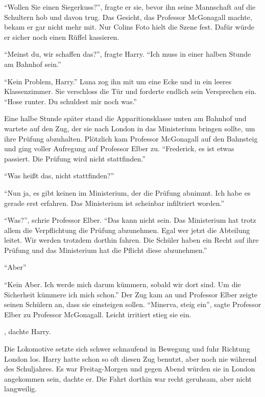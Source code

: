 \enquote{Wollen Sie einen Siegerkuss?}, fragte er sie, bevor ihn seine Mannschaft auf die Schultern hob und davon trug. Das Gesicht, das Professor McGonagall machte, bekam er gar nicht mehr mit. Nur Colins Foto hielt die Szene fest. Dafür würde er sicher noch einen Rüffel kassieren.

\trenn

\enquote{Meinst du, wir schaffen das?}, fragte Harry. \enquote{Ich muss in einer halben Stunde am Bahnhof sein.}

\enquote{Kein Problem, Harry.} Luna zog ihn mit um eine Ecke und in ein leeres Klassenzimmer. Sie verschloss die Tür und forderte endlich sein Versprechen ein. \enquote{Hose runter. Du schuldest mir noch was.}

Eine halbe Stunde später stand die Apparitionsklasse unten am Bahnhof und wartete auf den Zug, der sie nach London in das Ministerium bringen sollte, um ihre Prüfung abzuhalten. Plötzlich kam Professor McGonagall auf den Bahnsteig und ging voller Aufregung auf Professor Elber zu. \enquote{Frederick, es ist etwas passiert. Die Prüfung wird nicht stattfinden.}

\enquote{Was heißt das, nicht stattfinden?}

\enquote{Nun ja, es gibt keinen im Ministerium, der die Prüfung abnimmt. Ich habe es gerade erst erfahren. Das Ministerium ist scheinbar infiltriert worden.}

\enquote{Was?}, schrie Professor Elber. \enquote{Das kann nicht sein. Das Ministerium hat trotz allem die Verpflichtung die Prüfung abzunehmen. Egal wer jetzt die Abteilung leitet. Wir werden trotzdem dorthin fahren. Die Schüler haben ein Recht auf ihre Prüfung und das Ministerium hat die Pflicht diese abzunehmen.}

\enquote{Aber\gst}

\enquote{Kein Aber. Ich werde mich darum kümmern, sobald wir dort sind. Um die Sicherheit kümmere ich mich schon.} Der Zug kam an und Professor Elber zeigte seinen Schülern an, dass sie einsteigen sollen. \enquote{Minerva, steig ein}, sagte Professor Elber zu Professor McGonagall. Leicht irritiert stieg sie ein.

, dachte Harry. 

Die Lokomotive setzte sich schwer schnaufend in Bewegung und fuhr Richtung London los. Harry hatte schon so oft diesen Zug benutzt, aber noch nie während des Schuljahres. Es war Freitag-Morgen und gegen Abend würden sie in London angekommen sein, dachte er. Die Fahrt dorthin war recht geruhsam, aber nicht langweilig.


